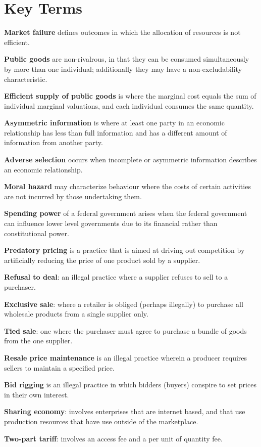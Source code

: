 \newpage
	\section*{Key Terms}
\begin{keyterms}
\textbf{Market failure} defines outcomes in which the allocation of resources is not efficient.

\textbf{Public goods} are non-rivalrous, in that they can be consumed simultaneously by more than one individual; additionally they may have a non-excludability characteristic.

\textbf{Efficient supply of public goods} is where the marginal cost equals the sum of individual marginal valuations, and each individual consumes the same quantity.

\textbf{Asymmetric information} is where at least one party in an economic relationship has less than full information and has a different amount of information from another party.

\textbf{Adverse selection} occurs when incomplete or asymmetric information describes an economic relationship.

\textbf{Moral hazard} may characterize behaviour where the costs of certain activities are not incurred by those undertaking them.

\textbf{Spending power} of a federal government arises when the federal government can influence lower level governments due to its financial rather than constitutional power.

\textbf{Predatory pricing} is a practice that is aimed at driving out competition by artificially reducing the price of one product sold by a supplier.

\textbf{Refusal to deal}: an illegal practice where a supplier refuses to sell to a purchaser.

\textbf{Exclusive sale}: where a retailer is obliged (perhaps illegally) to purchase all wholesale products from a single supplier only.

\textbf{Tied sale}: one where the purchaser must agree to purchase a bundle of goods from the one supplier.

\textbf{Resale price maintenance} is an illegal practice wherein a producer requires sellers to maintain a specified price.

\textbf{Bid rigging} is an illegal practice in which bidders (buyers) conspire to set prices in their own interest.

\textbf{Sharing economy}: involves enterprises that are internet based, and that use production resources that have use outside of the marketplace.

\textbf{Two-part tariff}: involves an access fee and a per unit of quantity fee.
\end{keyterms}